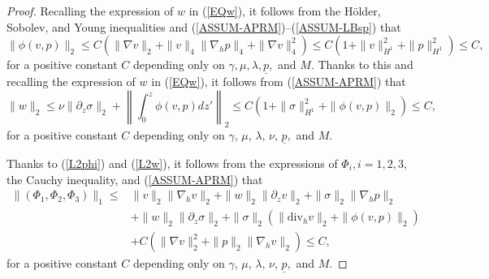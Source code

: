 \documentclass[12pt,reqno]{amsart}
\numberwithin{equation}{section}
\begin{document}
\begin{proof}
Recalling the expression of $w$ in (\ref{EQw}), it follows from the H\"older, Sobolev, and Young inequalities and
(\ref{ASSUM-APRM})--(\ref{ASSUM-LBsp}) that
\begin{equation}
  \|\phi(v,p)\|_2\leq C(\|\nabla v\|_2+\|v\|_4\|\nabla_hp\|_4+\|\nabla v\|_4^2)\leq C(1+\|v\|_{H^1}^2+\|p\|_{H^1}^2)\leq C,
  \label{L2phi}
\end{equation}
for a positive constant $C$ depending only on $\gamma, \mu, \lambda, \underline p,$ and $M$. Thanks to this and recalling the expression of $w$
in (\ref{EQw}), it follows from (\ref{ASSUM-APRM}) that
\begin{equation}
  \label{L2w}
  \|w\|_2\leq\nu\|\partial_z\sigma\|_2+\left\|\int_0^z\phi(v,p)dz'\right\|_2\leq C(1+\|\sigma\|_{H^1}^2+\|\phi(v,p)\|_2)\leq C,
\end{equation}
for a positive constant $C$ depending only on $\gamma$, $\mu$, $\lambda$, $\nu$, $\underline p,$ and $M$.

Thanks to (\ref{L2phi}) and (\ref{L2w}),
it follows from the expressions of $\Phi_i, i=1, 2, 3,$ the Cauchy inequality, and (\ref{ASSUM-APRM}) that
\begin{align}
  \|(\Phi_1, \Phi_2, \Phi_3)\|_1\leq&\|v\|_2\|\nabla_hv\|_2+\|w\|_2\|\partial_zv\|_2+\|\sigma\|_2\|\nabla_hp\|_2\nonumber\\
  &+\|w\|_2\|\partial_z\sigma\|_2+\|\sigma\|_2(\|\text{div}_hv\|_2  +\|\phi(v,p)\|_2)\nonumber\\
  &+C(\|\nabla v\|_2^2+\|p\|_2\|\nabla_hv\|_2)\leq C,\label{L1Phis}
\end{align}
for a positive constant $C$ depending only on $\gamma$, $\mu$, $\lambda$, $\nu$, $\underline p,$ and $M$.


\end{proof}
\end{document}
